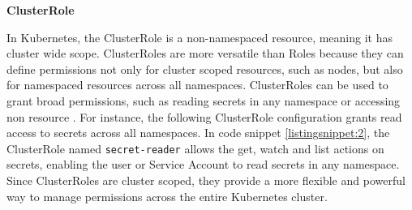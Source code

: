 \textbf{ClusterRole}

In Kubernetes, the ClusterRole is a non-namespaced resource, meaning it has cluster wide scope. ClusterRoles are more versatile than Roles because they can define permissions not only for cluster scoped resources, such as nodes, but also for namespaced resources across all namespaces. ClusterRoles can be used to grant broad permissions, such as reading secrets in any namespace or accessing non resource 
. For instance, the following ClusterRole configuration grants read access to secrets across all namespaces. In code snippet \autoref{listingsnippet:2}, the ClusterRole named \texttt{secret-reader} allows the get, watch and list actions on secrets, enabling the user or Service Account to read secrets in any namespace. Since ClusterRoles are cluster scoped, they provide a more flexible and powerful way to manage permissions across the entire Kubernetes cluster. \cite{Kubernetes_doc}


